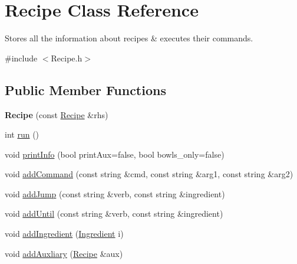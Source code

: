 \hypertarget{classRecipe}{\section{Recipe Class Reference}
\label{classRecipe}
}


Stores all the information about recipes \& executes their commands.  




{\ttfamily \#include $<$Recipe.\-h$>$}

\subsection*{Public Member Functions}
\begin{DoxyCompactItemize}
\item 
\hypertarget{classRecipe_aab4e4187d162a84a189622dbfd60fc3a}{{\bfseries Recipe} (const \hyperlink{classRecipe}{Recipe} \&rhs)}\label{classRecipe_aab4e4187d162a84a189622dbfd60fc3a}

\item 
int \hyperlink{classRecipe_a2cec7c48e273bbedca60469f2a33bc0b}{run} ()
\item 
void \hyperlink{classRecipe_aa9a086810c68a0f459f3eded4fec249d}{print\-Info} (bool print\-Aux=false, bool bowls\-\_\-only=false)
\item 
void \hyperlink{classRecipe_a75438df7365e67f4df888e5d92c55e82}{add\-Command} (const string \&cmd, const string \&arg1, const string \&arg2)
\item 
void \hyperlink{classRecipe_a89b9a5166511ac1bba135bb72f7f3ff5}{add\-Jump} (const string \&verb, const string \&ingredient)
\item 
void \hyperlink{classRecipe_aa3f724d89b2f98b5d1edc5b32b26677d}{add\-Until} (const string \&verb, const string \&ingredient)
\item 
void \hyperlink{classRecipe_a85c5fcfd5fbe1d1956e85ee1656af3a7}{add\-Ingredient} (\hyperlink{classIngredient}{Ingredient} i)
\item 
void \hyperlink{classRecipe_aa8238253913982ef70b6ea4bad997fed}{add\-Auxliary} (\hyperlink{classRecipe}{Recipe} \&aux)
\end{DoxyCompactItemize}
